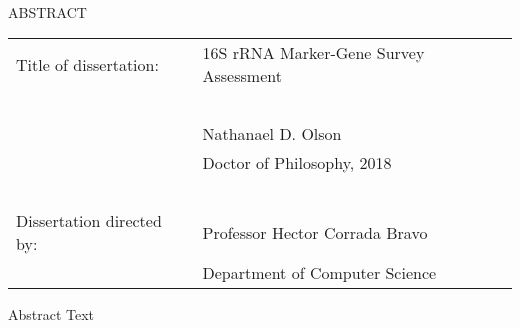 
\hbox{\ }

\renewcommand{\baselinestretch}{1}
\small \normalsize

\begin{center}
\large{{ABSTRACT}}

\vspace{3em}

\end{center}
\hspace{-.15in}
\begin{tabular}{ll}
Title of dissertation:    & {\large  16S rRNA Marker-Gene Survey Assessment}\\
\ \\
&                          {\large  Nathanael D. Olson} \\
&                           {\large Doctor of Philosophy, 2018} \\
\ \\
Dissertation directed by: & {\large  Professor Hector Corrada Bravo} \\
&               {\large  Department of Computer Science } \\
\end{tabular}

\vspace{3em}

\renewcommand{\baselinestretch}{2}
\large \normalsize

Abstract Text
